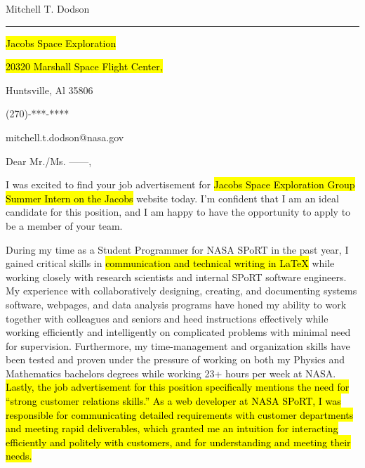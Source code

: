 \documentclass[11pt]{article}
\begin{document}
\begin{center}
        {\color{OliveGreen}\LARGE{Mitchell T. Dodson}}

        \vspace{1em}

\hrule

	\noindent
        \begin{minipage}[t]{.49\textwidth}
		\begin{singlespace}

		\noindent
		\hl{Jacobs Space Exploration}

		\noindent
		\hl{20320 Marshall Space Flight Center,}

		\noindent
		Huntsville, Al 35806

		\end{singlespace}
        \end{minipage}
        \begin{minipage}[t]{.49\textwidth}

		\vspace{1em}

                \hfill
                (270)-***-****

                \hfill
                mitchell.t.dodson@nasa.gov

        \end{minipage}
\end{center}


\vspace{2em}

\noindent
Dear Mr./Ms. ------,

\vspace{1em}
I was excited to find your job advertisement for \hl{Jacobs Space Exploration Group Summer Intern on the Jacobs} website today. I'm confident that I am an ideal candidate for this position, and I am happy to have the opportunity to apply to be a member of your team.

During my time as a Student Programmer for NASA SPoRT in the past year, I gained critical skills in \hl{communication and technical writing in LaTeX} while working closely with research scientists and internal SPoRT software engineers. My experience with collaboratively designing, creating, and documenting systems software, webpages, and data analysis programs have honed my ability to work together with colleagues and seniors and heed instructions effectively while working efficiently and intelligently on complicated problems with minimal need for supervision. Furthermore, my time-management and organization skills have been tested and proven under the pressure of working on both my Physics and Mathematics bachelors degrees while working 23+ hours per week at NASA. \hl{Lastly, the job advertisement for this position specifically mentions the need for ``strong customer relations skills.'' As a web developer at NASA SPoRT, I was responsible for communicating detailed requirements with customer departments and meeting rapid deliverables, which granted me an intuition for interacting efficiently and politely with customers, and for understanding and meeting their needs.}
\end{document}
